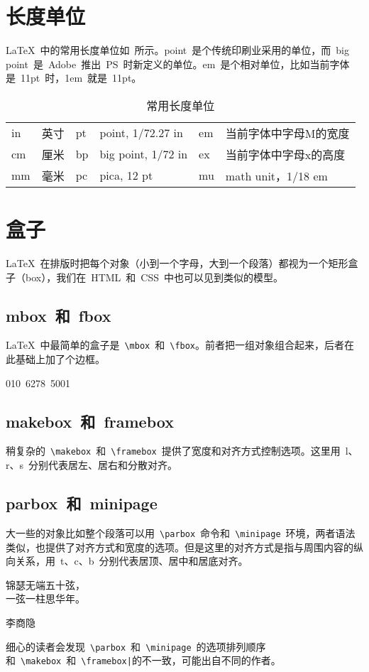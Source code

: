 \section{长度单位}
\LaTeX~中的常用长度单位如~所示。point~是个传统印刷业采用的单位，而~big point~是~Adobe~推出~PS~时新定义的单位。em~是个相对单位，比如当前字体是~11pt~时，1em~就是~11pt。
\begin{table}[htbp]
\caption{常用长度单位}
\label{tab:unit}
\centering
\begin{tabular}{llllll}
    \toprule
    in & 英寸 & pt & point, 1/72.27 in  & em & 当前字体中字母M的宽度 \\
    cm & 厘米 & bp & big point, 1/72 in & ex & 当前字体中字母x的高度 \\
    mm & 毫米 & pc & pica, 12 pt        & mu & math unit，1/18 em \\
    \bottomrule
\end{tabular}
\end{table}

\section{盒子}
\LaTeX~在排版时把每个对象（小到一个字母，大到一个段落）都视为一个矩形盒子（box），我们在~HTML~和~CSS~中也可以见到类似的模型。

\subsection{mbox~和~fbox}

\LaTeX~中最简单的盒子是~\verb|\mbox|~和~\verb|\fbox|。前者把一组对象组合起来，后者在此基础上加了个边框。
\begin{demo}
\mbox{010 6278 5001}
\end{demo}

\subsection{makebox~和~framebox}
稍复杂的~\verb|\makebox|~和~\verb|\framebox|~提供了宽度和对齐方式控制选项。这里用~l、r、s~分别代表居左、居右和分散对齐。
\begin{demo}
\end{demo}

\subsection{parbox~和~minipage}
大一些的对象比如整个段落可以用~\verb|\parbox|~命令和~\verb|\minipage|~环境，两者语法类似，也提供了对齐方式和宽度的选项。但是这里的对齐方式是指与周围内容的纵向关系，用~t、c、b~分别代表居顶、居中和居底对齐。

\begin{demo}
\parbox[c]{90pt}{锦瑟无端五十弦，\\一弦一柱思华年。}李商隐
\end{demo}

细心的读者会发现~\verb|\parbox|~和~\verb|\minipage|~的选项排列顺序和~\verb|\makebox|~和~\verb~\framebox|~的不一致，可能出自不同的作者。



\newpage
